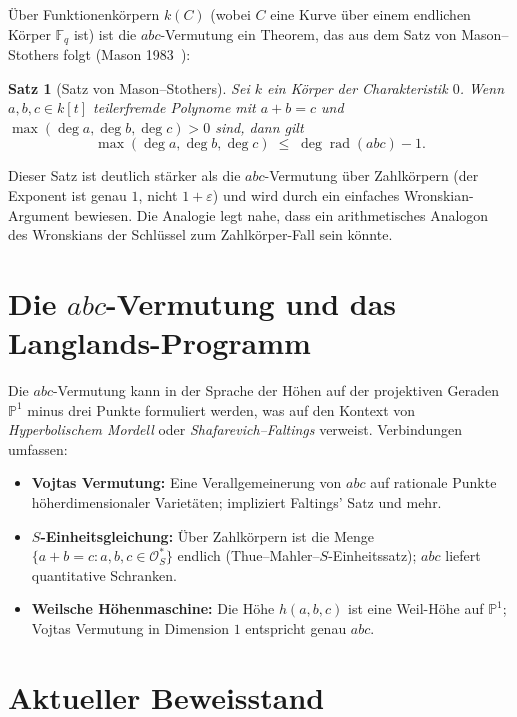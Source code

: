 \documentclass[12pt,a4paper]{article}
\newtheorem{theorem}{Satz}[section]
\theoremstyle{remark}
\begin{document}
Über Funktionenkörpern $k(C)$ (wobei $C$ eine Kurve über einem endlichen Körper
$\mathbb{F}_q$ ist) ist die $abc$-Vermutung ein Theorem, das aus dem Satz von
Mason--Stothers folgt (Mason 1983~\cite{Mason1984}):

\begin{theorem}[Satz von Mason--Stothers]
  Sei $k$ ein Körper der Charakteristik $0$. Wenn $a,b,c\in k[t]$ teilerfremde Polynome
  mit $a+b=c$ und $\max(\deg a,\deg b,\deg c)>0$ sind, dann gilt
  \[
    \max(\deg a,\deg b,\deg c) \;\leq\; \deg\operatorname{rad}(abc) - 1.
  \]
\end{theorem}

Dieser Satz ist deutlich stärker als die $abc$-Vermutung über Zahlkörpern (der Exponent
ist genau $1$, nicht $1+\varepsilon$) und wird durch ein einfaches Wronskian-Argument
bewiesen. Die Analogie legt nahe, dass ein arithmetisches Analogon des Wronskians der
Schlüssel zum Zahlkörper-Fall sein könnte.

\section{Die $abc$-Vermutung und das Langlands-Programm}

Die $abc$-Vermutung kann in der Sprache der Höhen auf der projektiven Geraden
$\mathbb{P}^1$ minus drei Punkte formuliert werden, was auf den Kontext von
\emph{Hyperbolischem Mordell} oder \emph{Shafarevich--Faltings} verweist.
Verbindungen umfassen:

\begin{itemize}[nosep]
  \item \textbf{Vojtas Vermutung:} Eine Verallgemeinerung von $abc$ auf rationale Punkte
    höherdimensionaler Varietäten; impliziert Faltings' Satz und mehr.
  \item \textbf{$S$-Einheitsgleichung:} Über Zahlkörpern ist die Menge
    $\{a+b=c : a,b,c\in\mathcal{O}_S^*\}$ endlich (Thue--Mahler--$S$-Einheitssatz);
    $abc$ liefert quantitative Schranken.
  \item \textbf{Weilsche Höhenmaschine:} Die Höhe $h(a,b,c)$ ist eine Weil-Höhe auf
    $\mathbb{P}^1$; Vojtas Vermutung in Dimension $1$ entspricht genau $abc$.
\end{itemize}

\section{Aktueller Beweisstand}
\end{document}
